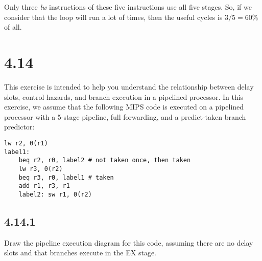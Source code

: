 \documentclass[paper=a4, fontsize=11pt]{scrartcl} %
\begin{document}
Only three \textit{lw} instructions of these five instructions use all five stages.
So, if we consider that the loop will run a lot of times, then the useful cycles is $3/5=60\%$ of all.


\section{4.14}
\begin{fancyquotes}
    This exercise is intended to help you understand the relationship between delay slots, control hazards, and branch execution in a pipelined processor. In this exercise, we assume that the following MIPS code is executed on a pipelined processor with a 5-stage pipeline, full forwarding, and a predict-taken branch predictor:

\begin{lstlisting}[language={[mips]Assembler}]
    lw r2, 0(r1)
label1:
    beq r2, r0, label2 # not taken once, then taken
    lw r3, 0(r2)
    beq r3, r0, label1 # taken
    add r1, r3, r1
    label2: sw r1, 0(r2)
\end{lstlisting}

\end{fancyquotes}

\subsection{4.14.1}
\begin{fancyquotes}
    Draw the pipeline execution diagram for this code, assuming there are no delay slots and that branches execute in the EX stage.
\end{fancyquotes}
\end{document}
